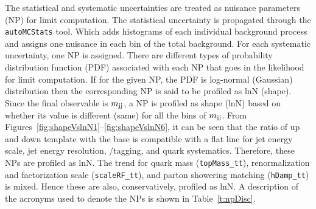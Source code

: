 The statistical and systematic uncertainties are treated as nuisance parameters (NP) for
limit computation. The statistical uncertainty is propagated through the \verb|autoMCStats| tool.
Which adds histograms of each individual background process and assigns one nuisance in each bin of
the total background. For each systematic uncertainty, one NP is assigned. There are different types 
of probability distribution function (PDF) associated with each NP that goes in the likelihood for 
limit computation. If for the given NP, the PDF is log-normal (Gaussian) distribution then the 
corresponding NP is said to be profiled as lnN (shape). Since the final observable is $m_\text{jj}$, 
a NP is profiled as shape (lnN) based on whether its value is different (same) for all 
the bins of $m_\text{jj}$. From Figures~\ref{fig:shapeVslnN1}--\ref{fig:shapeVslnN6}, it can be seen that 
the ratio of up and down template with the base is compatible with a flat line for jet energy scale,
jet energy resolution, \PQb/\PQc tagging, and \PQt quark \pt systematics. Therefore, these NPs are 
profiled as lnN. The trend for \PQt quark mass (\verb|topMass_tt|), renormalization and factorization
scale (\verb|scaleRF_tt|), and parton showering matching (\verb|hDamp_tt|) is mixed. Hence these are 
also, conservatively, profiled as lnN. A description of the acronyms used to denote the NPs is shown 
in Table~\ref{t:npDisc}.
